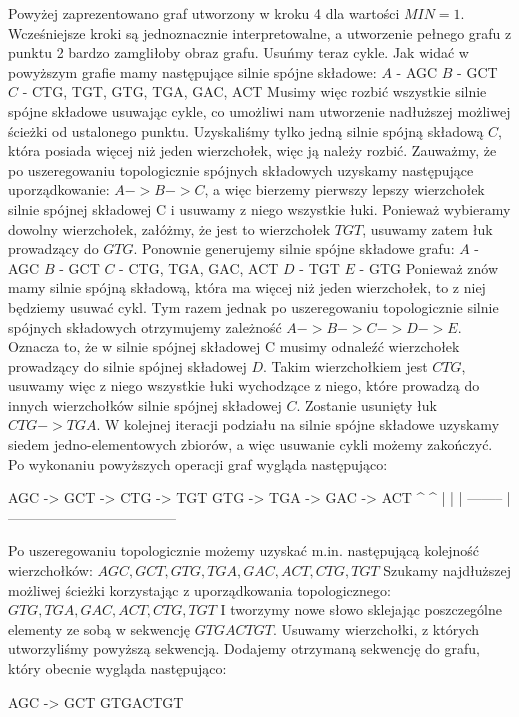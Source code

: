 \documentclass[a4paper]{article}
\begin{document}
Powyżej zaprezentowano graf utworzony w kroku 4 dla wartości $MIN=1$. Wcześniejsze kroki są jednoznacznie interpretowalne, a utworzenie pełnego grafu z punktu 2 bardzo zamgliłoby obraz grafu. Usuńmy teraz cykle.
Jak widać w powyższym grafie mamy następujące silnie spójne składowe:
$A$ - {AGC}
$B$ - {GCT}
$C$ - {CTG, TGT, GTG, TGA, GAC, ACT}
Musimy więc rozbić wszystkie silnie spójne składowe usuwając cykle, co umożliwi nam utworzenie nadłuższej możliwej ścieżki od ustalonego punktu.
Uzyskaliśmy tylko jedną silnie spójną składową $C$, która posiada więcej niż jeden wierzchołek, więc ją należy rozbić. Zauważmy, że po uszeregowaniu topologicznie spójnych składowych uzyskamy następujące uporządkowanie: $A->B->C$, a więc bierzemy pierwszy lepszy wierzchołek silnie spójnej składowej C i usuwamy z niego wszystkie łuki. Ponieważ wybieramy dowolny wierzchołek, załóżmy, że jest to wierzchołek $TGT$, usuwamy zatem łuk prowadzący do $GTG$.
Ponownie generujemy silnie spójne składowe grafu:
$A$ - {AGC}
$B$ - {GCT}
$C$ - {CTG, TGA, GAC, ACT}
$D$ - {TGT}
$E$ - {GTG}
Ponieważ znów mamy silnie spójną składową, która ma więcej niż jeden wierzchołek, to z niej będziemy usuwać cykl. Tym razem jednak po uszeregowaniu topologicznie silnie spójnych składowych otrzymujemy zależność $A->B->C->D->E$. Oznacza to, że w silnie spójnej składowej C musimy odnaleźć wierzchołek prowadzący do silnie spójnej składowej $D$. Takim wierzchołkiem jest $CTG$, usuwamy więc z niego wszystkie łuki wychodzące z niego, które prowadzą do innych wierzchołków silnie spójnej składowej $C$. Zostanie usunięty łuk $CTG->TGA$.
W kolejnej iteracji podziału na silnie spójne składowe uzyskamy siedem jedno-elementowych zbiorów, a więc usuwanie cykli możemy zakończyć. Po wykonaniu powyższych operacji graf wygląda następująco:

AGC -> GCT -> CTG -> TGT    GTG -> TGA -> GAC -> ACT
               ^      ^      |                    |
               |      --------                    |
               ------------------------------------

Po uszeregowaniu topologicznie możemy uzyskać m.in. następującą kolejność wierzchołków:
$AGC, GCT, GTG, TGA, GAC, ACT, CTG, TGT$
Szukamy najdłuższej możliwej ścieżki korzystając z uporządkowania topologicznego:
$GTG, TGA, GAC, ACT, CTG, TGT$
I tworzymy nowe słowo sklejając poszczególne elementy ze sobą w sekwencję $GTGACTGT$.
Usuwamy wierzchołki, z których utworzyliśmy powyższą sekwencją. Dodajemy otrzymaną sekwencję do grafu, który obecnie wygląda następująco:

AGC -> GCT         GTGACTGT
\end{document}
